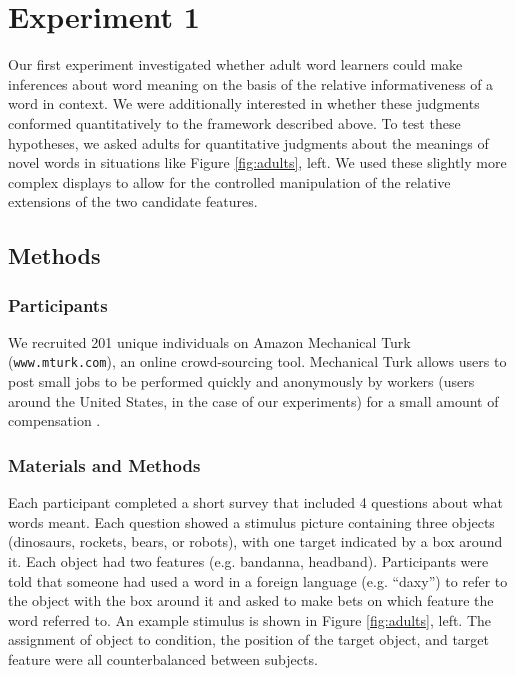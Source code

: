 \documentclass[review]{elsarticle}
\begin{document}
\section{Experiment 1}


Our first experiment investigated whether adult word learners could make inferences about word meaning on the basis of the relative informativeness of a word in context. We were additionally interested in whether these judgments conformed quantitatively to the framework described above. To test these hypotheses, we asked adults for quantitative judgments about the meanings of novel words in situations like Figure \ref{fig:adults}, left. We used these slightly more complex displays to allow for the controlled manipulation of the relative extensions of the two candidate features.

\subsection{Methods}

\subsubsection{Participants}

We recruited 201 unique individuals on Amazon Mechanical Turk (\texttt{www.mturk.com}), an online crowd-sourcing tool. Mechanical Turk allows users to post small jobs to be performed quickly and anonymously by workers (users around the United States, in the case of our experiments) for a small amount of compensation \citep{buhrmester2011,crump2013}. 

\subsubsection{Materials and Methods}

Each participant completed a short survey that included 4 questions about what words meant. Each question showed a stimulus picture containing three objects (dinosaurs, rockets, bears, or robots), with one target indicated by a box around it. Each object had two features (e.g. bandanna, headband). Participants were told that someone had used a word in a foreign language (e.g. ``daxy'') to refer to the object with the box around it and asked to make bets on which feature the word referred to. An example stimulus is shown in Figure \ref{fig:adults}, left. The assignment of object to condition, the position of the target object, and target feature were all counterbalanced between subjects. 
\end{document}
